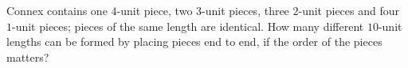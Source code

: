 Connex contains one $4$-unit piece, two $3$-unit pieces, three $2$-unit pieces and four $1$-unit pieces; pieces of the same length are identical. How many different $10$-unit lengths can be formed by placing pieces end to end, if the order of the pieces matters?
